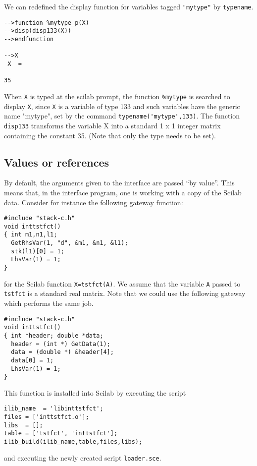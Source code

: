 We can redefined the display function for variables tagged \verb!"mytype"!
by \verb!typename!.
\begin{verbatim}
-->function %mytype_p(X)
-->disp(disp133(X))
-->endfunction
 
-->X
 X  =
 
35
\end{verbatim}
When \verb!X! is typed at the scilab prompt, the function \verb!%mytype!
is searched to display \verb!X!, since \verb!X! is a variable of type 133
and such variables have the generic name "mytype", set by the command
\verb!typename('mytype',133)!. The function \verb!disp133! transforms the
variable X into a standard 1 x 1 integer matrix containing the constant 35.
(Note that only the type needs to be set).

\subsection{Values or references}
By default, the arguments given to the interface are passed ``by value''.
This means that, in the interface program, one is working with a copy
of the Scilab data. Consider for instance the following gateway function:
\begin{verbatim}
#include "stack-c.h"
void inttstfct() 
{ int m1,n1,l1;
  GetRhsVar(1, "d", &m1, &n1, &l1);
  stk(l1)[0] = 1;
  LhsVar(1) = 1;
}
\end{verbatim}
for the Scilab function {\tt X=tstfct(A)}. We assume that the variable \verb!A!
passed to \verb!tstfct! is a standard real matrix.
Note that we could use the following gateway which performs the same job.
\begin{verbatim}
#include "stack-c.h"
void inttstfct() 
{ int *header; double *data;
  header = (int *) GetData(1);
  data = (double *) &header[4];  
  data[0] = 1;
  LhsVar(1) = 1;
}
\end{verbatim}
This function is installed into Scilab by executing the script
\begin{verbatim}
ilib_name  = 'libinttstfct';
files = ['inttstfct.o'];
libs  = [];
table = ['tstfct', 'inttstfct'];
ilib_build(ilib_name,table,files,libs);
\end{verbatim}
and executing the newly created script \verb!loader.sce!.


